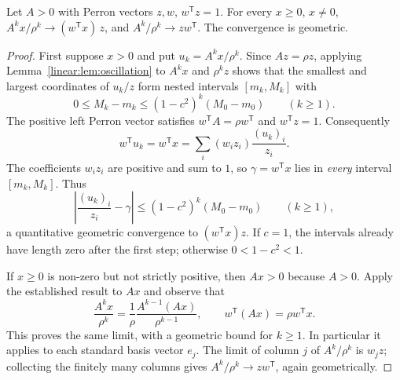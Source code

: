 \begin{theorem}\label{linear:thm:powerconv}
Let $A>0$ with Perron vectors $z,w$, $w^{\mathsf T}z=1$. For every $x\ge0$, $x\ne0$, $A^kx/\rho^k\to(w^{\mathsf T}x)\,z$, and
$A^k/\rho^k\to zw^{\mathsf T}$. The convergence is geometric.
\end{theorem}
\begin{proof}
First suppose $x>0$ and put
$u_k=A^kx/\rho^k$. Since $Az=\rho z$,
applying Lemma~\ref{linear:lem:oscillation} to
$A^kx$ and $\rho^kz$ shows that the smallest
and largest coordinates of $u_k/z$ form
nested intervals $[m_k,M_k]$ with
\[
0\le M_k-m_k\le(1-c^2)^k(M_0-m_0)\qquad(k\ge1).
\]
The positive left Perron vector satisfies
$w^{\mathsf T}A=\rho w^{\mathsf T}$ and
$w^{\mathsf T}z=1$. Consequently
\[
w^{\mathsf T}u_k=w^{\mathsf T}x
 =\sum_i(w_iz_i)\frac{(u_k)_i}{z_i}.
\]
The coefficients $w_iz_i$ are positive and sum
to $1$, so $\gamma=w^{\mathsf T}x$ lies in
\emph{every} interval $[m_k,M_k]$. Thus
\[
\left|\frac{(u_k)_i}{z_i}-\gamma\right|
 \le(1-c^2)^k(M_0-m_0)\qquad(k\ge1),
\]
a quantitative geometric convergence to
$(w^{\mathsf T}x)z$.
If $c=1$, the intervals already have length zero after the first step;
otherwise $0<1-c^2<1$.

If $x\ge0$ is non-zero but not strictly positive,
then $Ax>0$ because $A>0$. Apply the established
result to $Ax$ and observe that
\[
\frac{A^kx}{\rho^k}
=\frac1\rho\frac{A^{k-1}(Ax)}{\rho^{k-1}},
\qquad
w^{\mathsf T}(Ax)=\rho w^{\mathsf T}x.
\]
This proves the same limit, with a geometric
bound for $k\ge1$. In particular it applies to
each standard basis vector $e_j$. The limit
of column $j$ of $A^k/\rho^k$ is $w_jz$;
collecting the finitely many columns gives
$A^k/\rho^k\to zw^{\mathsf T}$, again
geometrically.
\end{proof}

